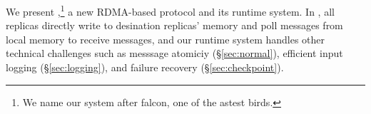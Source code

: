 %
%
%

We present \xxx,\footnote{We name our system after
falcon, one of the astest birds.} a new RDMA-based \paxos protocol and its
runtime system. In \xxx, all replicas directly write to desination
replicas' memory and poll messages from local memory to receive messages, and 
our runtime system handles other technical challenges such as messsage 
atomiciy (\S\ref{sec:normal}), efficient input logging (\S\ref{sec:logging}), 
and failure recovery (\S\ref{sec:checkpoint}).

